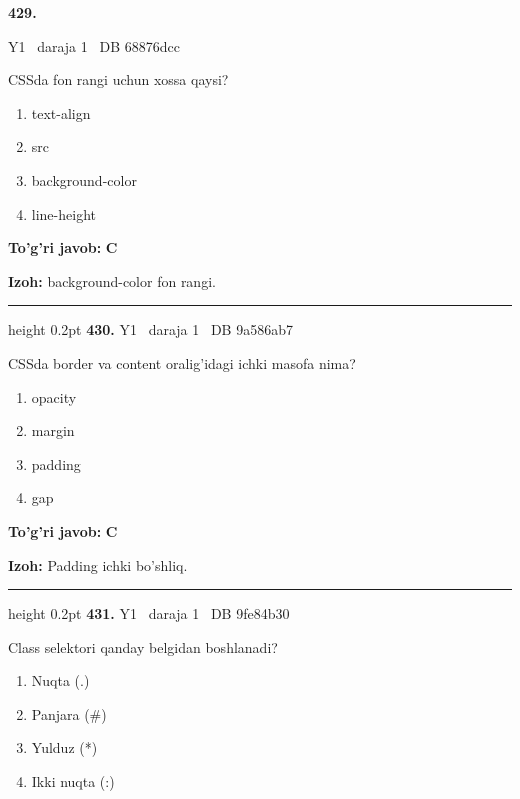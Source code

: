 \documentclass[10pt,a4paper,oneside]{article}
\begin{document}
\hypertarget{q429}{\textbf{\color{ink}429.}}  {\color{muted}\scriptsize Y1 \textbullet\ daraja 1 \textbullet\ DB 68876dcc}
\par
CSSda fon rangi uchun xossa qaysi?
\begin{enumerate}[label=\Alph*),leftmargin=9mm]
\item text-align
\item src
\item background-color
\item line-height
\end{enumerate}
\begin{tcolorbox}[enhanced,breakable,colback=teal!4,colframe=teal!45!black,boxrule=0.45pt,arc=1.2mm,left=2.8mm,right=2.8mm,top=2mm,bottom=2mm,before skip=2mm,after skip=2mm]
\textbf{\color{teal}To'g'ri javob:} \textbf{C}
\par\smallskip
\textbf{Izoh:} background-color fon rangi.
\end{tcolorbox}
\vspace{2mm}\hrule height 0.2pt \vspace{4mm}
\hypertarget{q430}{\textbf{\color{ink}430.}}  {\color{muted}\scriptsize Y1 \textbullet\ daraja 1 \textbullet\ DB 9a586ab7}
\par
CSSda border va content oralig'idagi ichki masofa nima?
\begin{enumerate}[label=\Alph*),leftmargin=9mm]
\item opacity
\item margin
\item padding
\item gap
\end{enumerate}
\begin{tcolorbox}[enhanced,breakable,colback=teal!4,colframe=teal!45!black,boxrule=0.45pt,arc=1.2mm,left=2.8mm,right=2.8mm,top=2mm,bottom=2mm,before skip=2mm,after skip=2mm]
\textbf{\color{teal}To'g'ri javob:} \textbf{C}
\par\smallskip
\textbf{Izoh:} Padding ichki bo'shliq.
\end{tcolorbox}
\vspace{2mm}\hrule height 0.2pt \vspace{4mm}
\hypertarget{q431}{\textbf{\color{ink}431.}}  {\color{muted}\scriptsize Y1 \textbullet\ daraja 1 \textbullet\ DB 9fe84b30}
\par
Class selektori qanday belgidan boshlanadi?
\begin{enumerate}[label=\Alph*),leftmargin=9mm]
\item Nuqta (.)
\item Panjara (\#)
\item Yulduz (*)
\item Ikki nuqta (:)
\end{enumerate}
\end{document}
